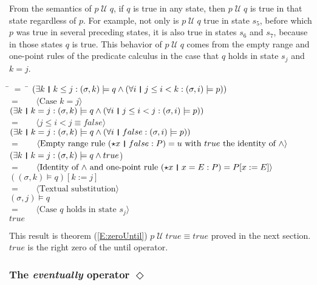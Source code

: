 \documentclass[fleqn, leqno]{article}
\newcommand{\lgap}{2pt}                             %
\newcommand{\mymathindent}{24pt}                    %
\newcommand{\Until}{\;\mathcal{U}\;}
\newcommand{\Event}{\Diamond\,}
\newcommand{\thedr}{\rule[-.25ex]{.32mm}{1.75ex}}   %
\newcommand{\dr}{\;\,\thedr\,\;}                    %
\newcommand{\rb}{:}                                 %
\newcommand{\all}{\forall}                          %
\newcommand{\ext}{\exists}                          %
\newcommand{\Gll} {\langle}                         %
\newcommand{\Ggg} {\rangle}                         %
\newcommand{\Hint}[1]     {\ \ \ $\Gll              \mbox{#1} \Ggg$ }   %
\begin{document}
From the semantics of $p\Until q$, if $q$ is true in any state, then $p\Until q$ is true in that state regardless of $p$.
For example, not only is $p\Until q$ true in state $s_5$, before which $p$ was true in several preceding states,
it is also true in states $s_6$ and $s_7$, because in those states $q$ is true.
This behavior of $p\Until q$ comes from the empty range and one-point rules \cite{LADM} of the predicate calculus in the case that
$q$ holds in state $s_j$ and $k=j$.

\begin{tabbing}
\hspace{\mymathindent} \= $= \;$ \= \kill
	\> \>   $(\ext k \dr k \le j \rb (\sigma,k) \models q \land (\all i \dr j\le i < k \rb (\sigma,i) \models p))$\\[\lgap]
	\> $=$  \>  \Hint{Case $k=j$}\\[\lgap]
	\> \>   $(\ext k \dr k=j \rb (\sigma,k) \models q \land (\all i \dr j\le i < j \rb (\sigma,i) \models p))$\\[\lgap]
	\> $=$  \>  \Hint{$j\le i < j \equiv false$}\\[\lgap]
	\> \>   $(\ext k \dr k=j \rb (\sigma,k) \models q \land (\all i \dr false \rb (\sigma,i) \models p))$\\[\lgap]
	\> $=$  \>  \Hint{Empty range rule $(\star x \dr false \rb P) =u$ with $true$ the identity of $\land$}\\[\lgap]
	\> \>   $(\ext k \dr k=j \rb (\sigma,k) \models q \land true$)\\[\lgap]
	\> $=$  \>  \Hint{Identity of $\land$ and one-point rule $(\star x\dr x=E\rb P) = P[x:=E]$}\\[\lgap]
	\> \>   $((\sigma,k) \models q)[k := j]$\\[\lgap]
	\> $=$  \>  \Hint{Textual substitution}\\[\lgap]
	\> \>   $(\sigma,j) \models q$\\[\lgap]
	\> $=$  \>  \Hint{Case $q$ holds in state $s_j$}\\[\lgap]
	\> \>   $true$
\end{tabbing}

This result is theorem (\ref{E:zeroUntil}) $p \Until true \equiv true$ proved in the next section.
$true$ is the right zero of the until operator.

\subsubsection*{The \textit{eventually} operator $\Event$}
\end{document}
